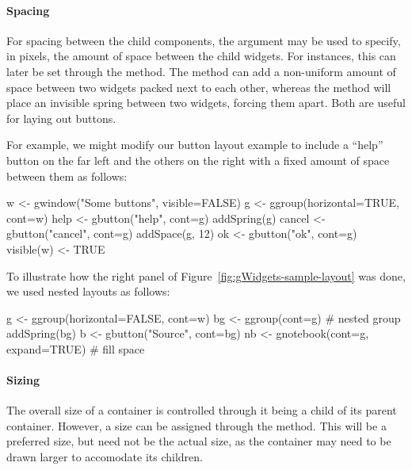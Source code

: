 \paragraph{Spacing}
For spacing between the child components, the argument
 may be used to specify, in pixels, the
amount of space between the child widgets. For 
instances, this can later be set through the 
method. The method  can add a non-uniform
amount of space between two widgets packed next to each other, whereas
the method  will place an invisible spring
between two widgets, forcing them apart.  Both are useful for laying
out buttons.


For example, we might modify our button layout example to include a
``help'' button on the far left and the others on the right with a
fixed amount of space between them as follows:
\begin{Schunk}
\begin{Sinput}
 w <- gwindow("Some buttons", visible=FALSE)
 g <- ggroup(horizontal=TRUE, cont=w)
 help <- gbutton("help", cont=g)
 addSpring(g)
 cancel <- gbutton("cancel", cont=g)
 addSpace(g, 12)
 ok <- gbutton("ok", cont=g)
 visible(w) <- TRUE
\end{Sinput}
\end{Schunk}


To illustrate how the right panel of
Figure~\ref{fig:gWidgets-sample-layout} was done, we used nested
layouts as follows:


\begin{Schunk}
\begin{Sinput}
 g <- ggroup(horizontal=FALSE, cont=w)
 bg <- ggroup(cont=g)                    # nested group
 addSpring(bg)
 b <- gbutton("Source", cont=bg)
 nb <- gnotebook(cont=g, expand=TRUE)    # fill space
\end{Sinput}
\end{Schunk}


\paragraph{Sizing}
The overall size of a  container is controlled through it
being a child of its parent container. However, a size can be assigned
through the  method. This will be a
preferred size, but need not be the actual size, as the container may
need to be drawn larger to accomodate its children. 



